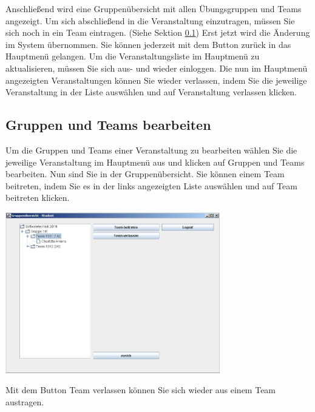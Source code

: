 \documentclass{Handbuch}
\begin{document}
Anschließend wird eine Gruppenübersicht mit allen Übungsgruppen und Teams angezeigt. Um sich abschließend in die Veranstaltung einzutragen, müssen Sie sich noch in ein Team eintragen. (Siehe Sektion \ref{sec:gruppenteamsbearbeiten})
Erst jetzt wird die Änderung im System übernommen.
Sie können jederzeit mit dem Button \frqq zurück\flqq{} in das Hauptmenü gelangen. Um die Veranstaltungsliste im Hauptmenü zu aktualisieren, müssen Sie sich aus- und wieder einloggen.
Die nun im Hauptmenü angezeigten Veranstaltungen können Sie wieder verlassen, indem Sie die jeweilige Veranstaltung in der Liste auswählen und auf \frqq Veranstaltung verlassen\flqq{} klicken. 

\subsection{Gruppen und Teams bearbeiten}\label{sec:gruppenteamsbearbeiten}
Um die Gruppen und Teams einer Veranstaltung zu bearbeiten wählen Sie die jeweilige Veranstaltung im Hauptmenü aus und klicken auf \frqq Gruppen und Teams bearbeiten\flqq{}.
Nun sind Sie in der Gruppenübersicht. Sie können einem Team beitreten, indem Sie es in der links angezeigten Liste auswählen und auf \frqq Team beitreten\flqq{} klicken. 
\begin{center}
	\includegraphics[width=0.7\textwidth]{img_student3.jpg}
\end{center}
Mit dem Button \frqq Team verlassen\flqq{} können Sie sich wieder aus einem Team austragen.
\end{document}
